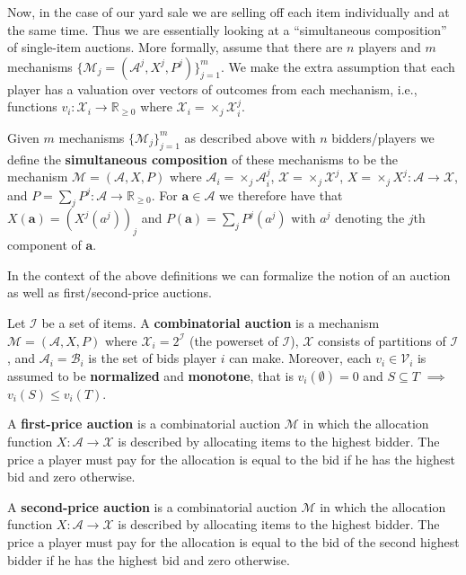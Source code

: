 Now, in the case of our yard sale we are selling off each item individually and at the same time. Thus we are essentially looking at a ``simultaneous composition'' of single-item auctions. More formally, assume that there are $ n $ players and $ m $ mechanisms $ \{\mathcal{M}_j = (\mathcal{A}^j, X^j, P^j)\}_{j = 1}^{m} $. We make the extra assumption that each player has a valuation over vectors of outcomes from each mechanism, i.e., functions $ v_i: \mathcal{X}_i \to \mathbb{R}_{\geq 0} $ where $ \mathcal{X}_i = \times_j \mathcal{X}_i^j $.
\begin{definition}
  Given $ m $ mechanisms $ \{\mathcal{M}_j\}_{j=1}^m $ as described above with $ n $ bidders/players we define the \textbf{simultaneous composition} of these mechanisms to be the mechanism $ \mathcal{M} = (\mathcal{A}, X, P) $ where $ \mathcal{A}_i = \times_j \mathcal{A}_i^{j} $, $ \mathcal{X} = \times_j \mathcal{X}^{j} $, $ X = \times_j X^{j}: \mathcal{A} \to \mathcal{X} $, and $ P = \sum_{j} P^j: \mathcal{A} \to \mathbb{R}_{\geq 0} $. For $ \mathbf{a} \in \mathcal{A} $ we therefore have that $ X(\mathbf{a}) = (X^j(a^j))_j $ and $ P(\mathbf{a}) = \sum_{j} P^j(a^j) $ with $ a^j $ denoting the $ j $th component of $ \mathbf{a} $.
\end{definition}

In the context of the above definitions we can formalize the notion of an auction as well as first/second-price auctions.
\begin{definition}
  Let $ \mathcal{I} $ be a set of items. A \textbf{combinatorial auction} is a mechanism $ \mathcal{M} = (\mathcal{A}, X, P) $ where $ \mathcal{X}_i = 2^\mathcal{I} $ (the powerset of $ \mathcal{I} $), $ \mathcal{X} $ consists of partitions of $ \mathcal{I} $, and $ \mathcal{A}_i = \mathcal{B}_i $ is the set of bids player $ i $ can make. Moreover, each $ v_i \in \mathcal{V}_i $ is assumed to be \textbf{normalized} and \textbf{monotone}, that is $ v_i(\emptyset) = 0 $ and $ S \subseteq T $ $ \implies $ $ v_i(S) \leq v_i(T) $.
\end{definition}
\begin{definition}
  A \textbf{first-price auction} is a combinatorial auction $ \mathcal{M} $ in which the allocation function $ X: \mathcal{A} \to \mathcal{X} $ is described by allocating items to the highest bidder. The price a player must pay for the allocation is equal to the bid if he has the highest bid and zero otherwise.
\end{definition}
\begin{definition}
  A \textbf{second-price auction} is a combinatorial auction $ \mathcal{M} $ in which the allocation function $ X: \mathcal{A} \to \mathcal{X} $ is described by allocating items to the highest bidder. The price a player must pay for the allocation is equal to the bid of the second highest bidder if he has the highest bid and zero otherwise.
\end{definition}

